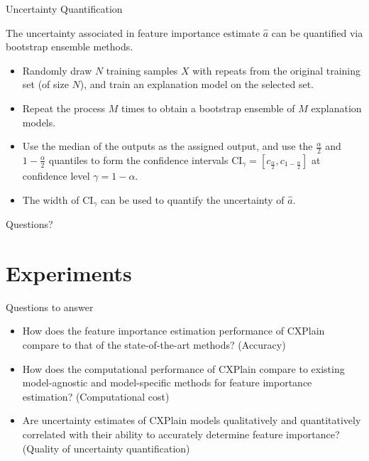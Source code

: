 \documentclass[10pt]{beamer}
\begin{document}
\begin{frame}{Uncertainty Quantification}

The uncertainty associated in feature importance estimate $\hat{a} $ can be quantified via bootstrap ensemble methods.
\begin{itemize}
\item Randomly draw $N$ training samples $X$ with repeats from the original training set (of size $N$), and train an explanation model on the selected set.
\item Repeat the process $M$ times to obtain a bootstrap ensemble of $M$ explanation models.
\item Use the median of the outputs as the assigned output, and use the $\frac{\alpha}{2}$ and $1-\frac{\alpha}{2}$ quantiles to form the confidence intervals $\text{CI}_{\gamma} = [c_{\frac{\alpha}{2}}, c_{1-\frac{\alpha}{2}}]$ at confidence level $\gamma = 1-\alpha$.
\item The width of $\text{CI}_{\gamma} $ can be used to quantify the uncertainty of $\hat{a} $.
\end{itemize}
\end{frame}

\begin{frame}
\centering
\Huge Questions?
\end{frame}

\section{Experiments}

\begin{frame}{Questions to answer}
\begin{itemize}
\item How does the feature importance estimation performance of CXPlain compare to that of the state-of-the-art methods? (Accuracy)
\item How does the computational performance of CXPlain compare to existing model-agnostic and model-specific methods for feature importance estimation? (Computational cost)
\item Are uncertainty estimates of CXPlain models qualitatively and quantitatively correlated with their ability to accurately determine feature importance? (Quality of uncertainty quantification)
\end{itemize}
\end{frame}
\end{document}
